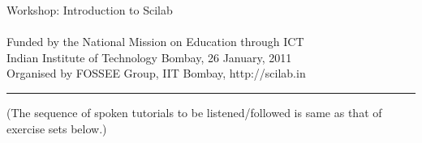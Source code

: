 \documentclass[12pt,a4paper]{article}
\begin{document}
\begin{center}
{\Large Workshop: Introduction to Scilab}
\\
 \\
 \vspace{5pt}
{\large Funded by the National Mission on Education through ICT}
\\
Indian Institute of Technology Bombay, 
26 January, 2011\\ 
Organised by FOSSEE Group, IIT Bombay, http://scilab.in
\\
\rule{\linewidth}{1pt}
(The sequence of spoken tutorials to be listened/followed is same as that of exercise sets below.)
\end{center}
\end{document}
